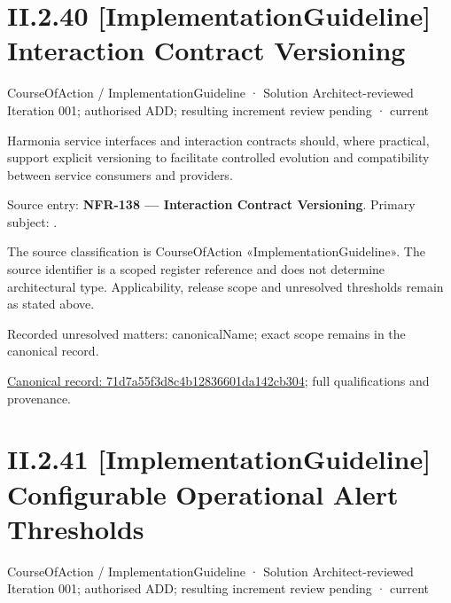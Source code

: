 \section*{II.2.40 [ImplementationGuideline] Interaction Contract Versioning}
\label{navigation:II.2.40}

\label{element:71d7a55f3d8c4b12836601da142cb304}
{\small CourseOfAction / ImplementationGuideline · Solution Architect-reviewed Iteration 001; authorised ADD; resulting increment review pending · current}\par

Harmonia service interfaces and interaction contracts should, where practical, support explicit versioning to facilitate controlled evolution and compatibility between service consumers and providers.



Source entry: \textbf{NFR-138 — Interaction Contract Versioning}. Primary subject: \texttt{}.



The source classification is CourseOfAction «ImplementationGuideline». The source identifier is a scoped register reference and does not determine architectural type. Applicability, release scope and unresolved thresholds remain as stated above.


{\small Recorded unresolved matters: canonicalName; exact scope remains in the canonical record.}\par
{\footnotesize \href{../../../../continuum/strategy/course-of-action/implementation-guideline/71d7a55f3d8c4b12836601da142cb304.md}{Canonical record: 71d7a55f3d8c4b12836601da142cb304}; full qualifications and provenance.}\par
\section*{II.2.41 [ImplementationGuideline] Configurable Operational Alert Thresholds}
\label{navigation:II.2.41}

\label{element:587db702f9134c5b8292f894dbcba53d}
{\small CourseOfAction / ImplementationGuideline · Solution Architect-reviewed Iteration 001; authorised ADD; resulting increment review pending · current}\par

